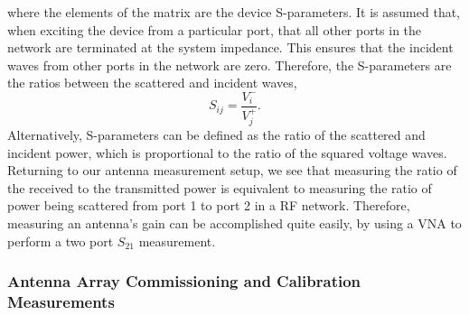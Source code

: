 where the elements of the matrix are the device S-parameters. It is assumed that, when exciting the device from a particular port, that all other ports in the network are terminated at the system impedance. This ensures that the incident waves from other ports in the network are zero. Therefore, the S-parameters are the ratios between the scattered and incident waves,
\begin{equation}
    S_{ij} = \frac{V_i^-}{V_j^+}.
\end{equation}
Alternatively, S-parameters can be defined as the ratio of the scattered and incident power, which is proportional to the ratio of the squared voltage waves. Returning to our antenna measurement setup, we see that measuring the ratio of the received to the transmitted power is equivalent to measuring the ratio of power being scattered from port 1 to port 2 in a RF network. Therefore, measuring an antenna's gain can be accomplished quite easily, by using a VNA to perform a two port $S_{21}$ measurement.

\subsubsection{Antenna Array Commissioning and Calibration Measurements}

